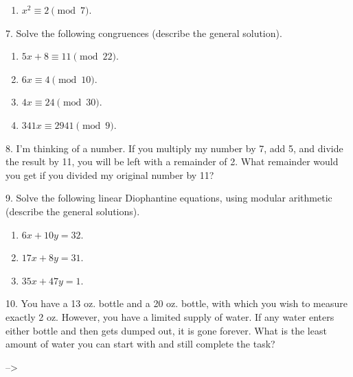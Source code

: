 \documentclass[10pt,]{book}
\theoremstyle{plain}
\theoremstyle{definition}
\theoremstyle{definition}
\theoremstyle{definition}
\numberwithin{equation}{chapter}
\begin{document}
\begin{exerciselist}
\begin{enumerate}[label=(\alph*)]
\item\hypertarget{li-1422}{}\(x^2 \equiv 2 \pmod 7\).%
\end{enumerate}
\par\smallskip
\item[7.]\hypertarget{exercise-344}{}
Solve the following congruences (describe the general solution).
%
\leavevmode%
\begin{enumerate}[label=(\alph*)]
\item\hypertarget{li-1429}{}\(5x + 8 \equiv 11 \pmod{22}\).%
\item\hypertarget{li-1430}{}\(6x \equiv 4 \pmod{10}\).%
\item\hypertarget{li-1431}{}\(4x \equiv 24 \pmod{30}\).%
\item\hypertarget{li-1432}{}\(341x \equiv 2941 \pmod{9}\).%
\end{enumerate}
\par\smallskip
\item[8.]\hypertarget{exercise-345}{}
I'm thinking of a number. If you multiply my number by 7, add 5, and divide the result by 11, you will be left with a remainder of 2. What remainder would you get if you divided my original number by 11?
%
\par\smallskip
\item[9.]\hypertarget{exercise-346}{}
Solve the following linear Diophantine equations, using modular arithmetic (describe the general solutions).
%
\leavevmode%
\begin{enumerate}[label=(\alph*)]
\item\hypertarget{li-1437}{}\(6x + 10y = 32\).%
\item\hypertarget{li-1438}{}\(17x + 8y = 31\).%
\item\hypertarget{li-1439}{}\(35x + 47y = 1\).%
\end{enumerate}
\par\smallskip
\item[10.]\hypertarget{exercise-347}{}
You have a 13 oz. bottle and a 20 oz. bottle, with which you wish to measure exactly 2 oz. However, you have a limited supply of water. If any water enters either bottle and then gets dumped out, it is gone forever. What is the least amount of water you can start with and still complete the task?
%
\par\smallskip
\end{exerciselist}
 -->

%
%
%
\appendix
%
\typeout{************************************************}
\typeout{************************************************}
\end{document}
